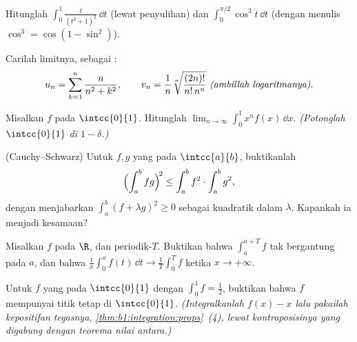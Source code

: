 \begin{exercise}[$\star$]\label{exo:b1:integration:2}
Hitunglah $\displaystyle\int_0^{1} \frac{t}{(t^2+1)^2}\,\dd t$
(lewat penyulihan) dan
$\displaystyle\int_0^{\pi/2} \cos^3 t\, \dd t$ (dengan menulis $\cos^3 =
\cos(1 - \sin^2)$).
\end{exercise}

\begin{exercise}[$\star$]\label{exo:b1:integration:3}
Carilah limitnya, sebagai :
\[
u_n = \sum_{k=1}^{n} \frac{n}{n^2 + k^2},
\qquad
v_n = \frac{1}{n}\sqrt[n]{\frac{(2n)!}{n!\,n^n}}
\ \emph{(ambillah logaritmanya)}.
\]
\end{exercise}

\begin{exercise}[$\star$]\label{exo:b1:integration:4}
Misalkan $f$  pada $\intcc{0}{1}$. Hitunglah $\lim_{n\to\infty}
\int_0^1 x^n f(x)\,\dd x$. \emph{(Potonglah $\intcc{0}{1}$ di $1 -
\delta$.)}
\end{exercise}

\begin{exercise}[$\star\star$]\label{exo:b1:integration:5}
(Cauchy--Schwarz) Untuk $f, g$ yang  pada $\intcc{a}{b}$, buktikanlah
\[
\Bigl(\int_a^b fg\Bigr)^{\!2} \leq \int_a^b f^2 \cdot \int_a^b g^2 ,
\]
dengan menjabarkan $\int_a^b (f + \lambda g)^2 \geq 0$ sebagai kuadratik dalam
$\lambda$. Kapankah ia menjadi kesamaan?
\end{exercise}

\begin{exercise}[$\star\star$]\label{exo:b1:integration:6}
Misalkan $f$  pada $\R$, dan periodik-$T$. Buktikan bahwa $\int_a^{a+T}
f$ tak bergantung pada $a$, dan bahwa $\frac1x \int_0^x f(t)\,\dd t
\to \frac 1T \int_0^T f$ ketika $x \to +\infty$.
\end{exercise}

\begin{exercise}[$\star\star$]\label{exo:b1:integration:7}
Untuk $f$ yang  pada $\intcc{0}{1}$ dengan $\int_0^1 f = \frac12$,
buktikan bahwa $f$ mempunyai titik tetap di $\intcc{0}{1}$. \emph{(Integralkanlah
$f(x) - x$ lalu pakailah kepositifan tegasnya,
\cref{thm:b1:integration:props}~(4), lewat kontraposisinya
yang digabung dengan teorema nilai antara.)}
\end{exercise}

